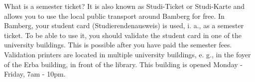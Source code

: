What is a semester ticket?
It is also known as Studi-Ticket or Studi-Karte and allows you to use the local public transport around Bamberg for free.
In Bamberg, your student card (Studierendenausweis) is used, i. a., as a semester ticket.
To be able to use it, you should validate the student card in one of the university buildings.
This is possible after you have paid the semester fees.
Validation printers are located in multiple university buildings, e. g., in the foyer of the Erba building, in front of the library.
This building is opened Monday - Friday, 7am - 10pm. 
